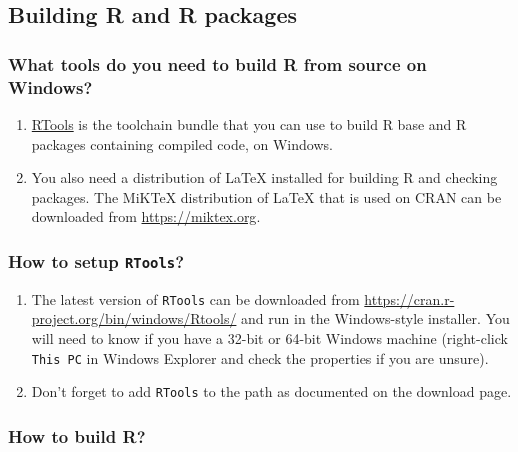 \documentclass[
]{book}
\begin{document}
\hypertarget{building-r-and-r-packages}{%
\subsection{Building R and R packages}\label{building-r-and-r-packages}}

\hypertarget{what-tools-do-you-need-to-build-r-from-source-on-windows}{%
\subsubsection{What tools do you need to build R from source on Windows?}\label{what-tools-do-you-need-to-build-r-from-source-on-windows}}

\begin{enumerate}
\def\labelenumi{\arabic{enumi}.}
\item
  \href{https://github.com/r-windows/docs/blob/master/faq.md\#what-is-rtools}{RTools} is the toolchain bundle that you can use to build R base and R packages containing compiled code, on Windows.
\item
  You also need a distribution of LaTeX installed for building R and checking packages.
  The MiKTeX distribution of LaTeX that is used on CRAN can be downloaded from \url{https://miktex.org}.
\end{enumerate}

\hypertarget{how-to-setup-rtools}{%
\subsubsection{\texorpdfstring{How to setup \texttt{RTools}?}{How to setup RTools?}}\label{how-to-setup-rtools}}

\begin{enumerate}
\def\labelenumi{\arabic{enumi}.}
\item
  The latest version of \texttt{RTools} can be downloaded from \url{https://cran.r-project.org/bin/windows/Rtools/} and run in the Windows-style installer.
  You will need to know if you have a 32-bit or 64-bit Windows machine (right-click \texttt{This\ PC} in Windows Explorer and check the properties if you are unsure).
\item
  Don't forget to add \texttt{RTools} to the path as documented on the download page.
\end{enumerate}

\hypertarget{how-to-build-r}{%
\subsubsection{How to build R?}\label{how-to-build-r}}
\end{document}
